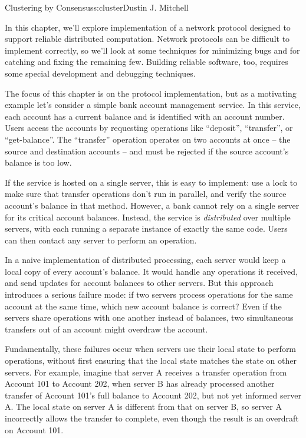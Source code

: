 \begin{aosachapter}{Clustering by Consensus}{s:cluster}{Dustin J. Mitchell}

In this chapter, we'll explore implementation of a network protocol
designed to support reliable distributed computation. Network protocols
can be difficult to implement correctly, so we'll look at some
techniques for minimizing bugs and for catching and fixing the remaining
few. Building reliable software, too, requires some special development
and debugging techniques.

\label{motivating-example}

The focus of this chapter is on the protocol implementation, but as a
motivating example let's consider a simple bank account management
service. In this service, each account has a current balance and is
identified with an account number. Users access the accounts by
requesting operations like ``deposit'', ``transfer'', or
``get-balance''. The ``transfer'' operation operates on two accounts at
once -- the source and destination accounts -- and must be rejected if
the source account's balance is too low.

If the service is hosted on a single server, this is easy to implement:
use a lock to make sure that transfer operations don't run in parallel,
and verify the source account's balance in that method. However, a bank
cannot rely on a single server for its critical account balances.
Instead, the service is \emph{distributed} over multiple servers, with
each running a separate instance of exactly the same code. Users can
then contact any server to perform an operation.

In a naive implementation of distributed processing, each server would
keep a local copy of every account's balance. It would handle any
operations it received, and send updates for account balances to other
servers. But this approach introduces a serious failure mode: if two
servers process operations for the same account at the same time, which
new account balance is correct? Even if the servers share operations
with one another instead of balances, two simultaneous transfers out of
an account might overdraw the account.

Fundamentally, these failures occur when servers use their local state
to perform operations, without first ensuring that the local state
matches the state on other servers. For example, imagine that server A
receives a transfer operation from Account 101 to Account 202, when
server B has already processed another transfer of Account 101's full
balance to Account 202, but not yet informed server A. The local state
on server A is different from that on server B, so server A incorrectly
allows the transfer to complete, even though the result is an overdraft
on Account 101.


\end{aosachapter}
